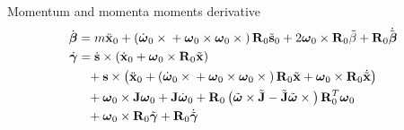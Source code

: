 \documentclass[10pt,dvips,fleqn,subeqn]{report}
\newcommand{\T}[1]{\bm{\mathbf{#1}}}
\newcommand{\TT}[1]{\bm{\mathbf{#1}}}
\begin{document}
Momentum and momenta moments derivative
\begin{subequations}
\begin{align}
	\dot{\T{\beta}}
	&= m \ddot{\T{x}}_0
	+ \plbr{
		\dot{\T{\omega}}_0 \times{}
		+ \T{\omega}_0 \times \T{\omega}_0 \times{}
	} \TT{R}_0 \tilde{\T{s}}_0
	+ 2 \T{\omega}_0 \times \TT{R}_0 \tilde{\beta}
	+ \TT{R}_0 \dot{\tilde{\T{\beta}}} \\
	\dot{\T{\gamma}}
	&= \dot{\T{s}} \times \plbr{
		\dot{\T{x}}_0
		+ \T{\omega}_0 \times \TT{R}_0 \tilde{\T{x}}
	}
	\nonumber \\
	&\hphantom{=}+ \T{s} \times \plbr{
		\ddot{\T{x}}_0
		+ \plbr{
			\dot{\T{\omega}}_0 \times{}
			+ \T{\omega}_0 \times \T{\omega}_0 \times{}
		} \TT{R}_0 \tilde{\T{x}}
		+ \T{\omega}_0 \times \TT{R}_0 \dot{\tilde{\T{x}}}
	}
	\nonumber \\
	&\hphantom{=}+ \T{\omega}_0 \times \TT{J} \T{\omega}_0
	+ \TT{J} \dot{\T{\omega}}_0
	+ \TT{R}_0 \plbr{
		\tilde{\T{\omega}} \times \tilde{\TT{J}}
		- \tilde{\TT{J}} \tilde{\T{\omega}} \times{}
	} \TT{R}_0^T \T{\omega}_0
	\nonumber \\
	&\hphantom{=}+ \T{\omega}_0 \times \TT{R}_0 \tilde{\T{\gamma}}
	+ \TT{R}_0 \dot{\tilde{\T{\gamma}}}
\end{align}
\end{subequations}
\end{document}
